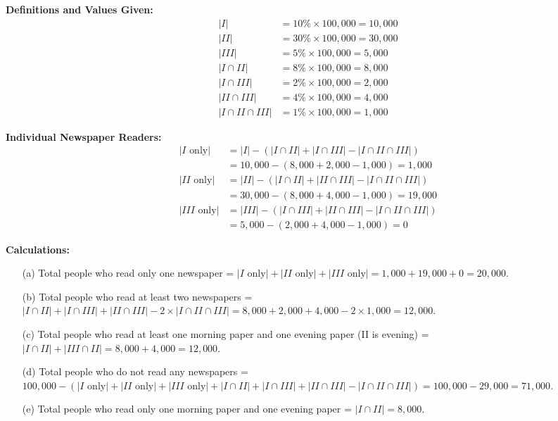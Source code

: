        \begin{solution}
            \textbf{Definitions and Values Given:}
            \begin{align*}
                |I| &= 10\% \times 100,000 = 10,000 \\
                |II| &= 30\% \times 100,000 = 30,000 \\
                |III| &= 5\% \times 100,000 = 5,000 \\
                |I \cap II| &= 8\% \times 100,000 = 8,000 \\
                |I \cap III| &= 2\% \times 100,000 = 2,000 \\
                |II \cap III| &= 4\% \times 100,000 = 4,000 \\
                |I \cap II \cap III| &= 1\% \times 100,000 = 1,000
            \end{align*}

            \textbf{Individual Newspaper Readers:}
            \begin{align*}
                |I \text{ only}| &= |I| - (|I \cap II| + |I \cap III| - |I \cap II \cap III|) \\
                &= 10,000 - (8,000 + 2,000 - 1,000) = 1,000 \\
                |II \text{ only}| &= |II| - (|I \cap II| + |II \cap III| - |I \cap II \cap III|) \\
                &= 30,000 - (8,000 + 4,000 - 1,000) = 19,000 \\
                |III \text{ only}| &= |III| - (|I \cap III| + |II \cap III| - |I \cap II \cap III|) \\
                &= 5,000 - (2,000 + 4,000 - 1,000) = 0
            \end{align*}

            \textbf{Calculations:}
            \begin{enumerate}
                \item[(a)] Total people who read only one newspaper = \( |I \text{ only}| + |II \text{ only}| + |III \text{ only}| = 1,000 + 19,000 + 0 = 20,000. \)
                \item[(b)] Total people who read at least two newspapers = \( |I \cap II| + |I \cap III| + |II \cap III| - 2 \times |I \cap II \cap III| = 8,000 + 2,000 + 4,000 - 2 \times 1,000 = 12,000. \)
                \item[(c)] Total people who read at least one morning paper and one evening paper (II is evening) = \( |I \cap II| + |III \cap II| = 8,000 + 4,000 = 12,000. \)
                \item[(d)] Total people who do not read any newspapers = \( 100,000 - (|I \text{ only}| + |II \text{ only}| + |III \text{ only}| + |I \cap II| + |I \cap III| + |II \cap III| - |I \cap II \cap III|) = 100,000 - 29,000 = 71,000. \)
                \item[(e)] Total people who read only one morning paper and one evening paper = \( |I \cap II| = 8,000. \)
            \end{enumerate}
        \end{solution}

